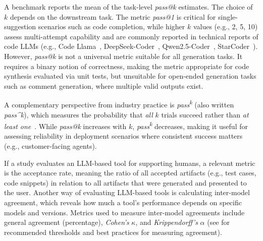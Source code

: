 A benchmark reports the mean of the task-level \emph{pass@k} estimates.
The choice of $k$ depends on the downstream task. The metric \emph{pass@1} is critical for single-suggestion scenarios such as code completion, while higher $k$ values (e.g., 2, 5, 10) assess multi-attempt capability and are commonly reported in technical reports of code LLMs (e.g., Code Llama~\cite{DBLP:journals/corr/abs-2308-12950}, DeepSeek-Coder~\cite{DBLP:journals/corr/abs-2401-14196}, Qwen2.5-Coder~\cite{DBLP:journals/corr/abs-2409-12186}, StarCoder~\cite{DBLP:journals/tmlr/LiAZMKMMALCLZZW23}).
However, \emph{pass@k} is not a universal metric suitable for all generation tasks.
It requires a binary notion of correctness, making the metric appropriate for code synthesis evaluated via unit tests, but unsuitable for open-ended generation tasks such as comment generation, where multiple valid outputs exist.

A complementary perspective from industry practice is \emph{pass\textsuperscript{k}} (also written \emph{pass\^{}k}), which measures the probability that \emph{all} $k$ trials succeed rather than \emph{at least one}~\cite{Anthropic2025evals}. While \emph{pass@k} increases with $k$, \emph{pass\textsuperscript{k}} decreases, making it useful for assessing reliability in deployment scenarios where consistent success matters (e.g., customer-facing agents).

If a study evaluates an LLM-based tool for supporting humans, a relevant metric is the acceptance rate, meaning the ratio of all accepted artifacts (e.g., test cases, code snippets) in relation to all artifacts that were generated and presented to the user.
Another way of evaluating LLM-based tools is calculating inter-model agreement, which reveals how much a tool's performance depends on specific models and versions.
Metrics used to measure inter-model agreements include general agreement (percentage), \emph{Cohen's} $\kappa$, and \emph{Krippendorff's} $\alpha$ (see \humanvalidation for recommended thresholds and best practices for measuring agreement).

